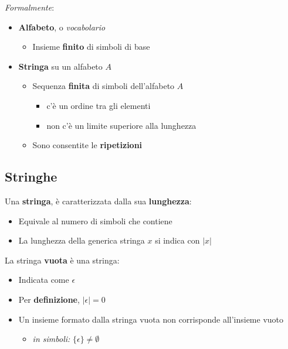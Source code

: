 \documentclass[italian, 10pt]{article}
\begin{document}
\textit{Formalmente}:
\begin{itemize}
  \item \textbf{Alfabeto}, o \textit{vocabolario}
        \begin{itemize}
          \item Insieme \textbf{finito} di simboli di base
        \end{itemize}
  \item \textbf{Stringa} su un alfabeto \(A\)
        \begin{itemize}
          \item Sequenza \textbf{finita} di simboli dell'alfabeto \(A\)
                \begin{itemize}[label=\(\rightarrow\)]
                  \item c'è un ordine tra gli elementi
                  \item non c'è un limite superiore alla lunghezza
                \end{itemize}
          \item Sono consentite le \textbf{ripetizioni}
        \end{itemize}
\end{itemize}

\subsection{Stringhe}

Una \textbf{stringa}, è caratterizzata dalla sua \textbf{lunghezza}:

\begin{itemize}
  \item Equivale al numero di simboli che contiene
  \item La lunghezza della generica stringa \(x\) si indica con \(|x|\)
\end{itemize}

La stringa \textbf{vuota} è una stringa:

\begin{itemize}
  \item Indicata come \(\epsilon\)
  \item Per \textbf{definizione}, \(|\epsilon| = 0\)
  \item Un insieme formato dalla stringa vuota non corrisponde all'insieme vuoto
        \begin{itemize}[label=\(\rightarrow\)]
          \item \textit{in simboli:} \(\{\epsilon\} \neq \emptyset\)
        \end{itemize}
\end{itemize}
\end{document}
